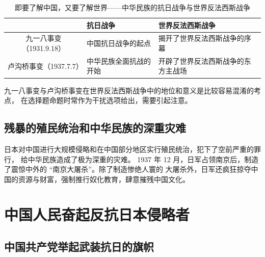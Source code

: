 \documentclass[10pt, UTF8]{book} %
\begin{document}
\begin{table}[H]
    \centering
    \caption{即要了解中国，又要了解世界——中华民族的抗日战争与世界反法西斯战争}
    \begin{tabular}{c|p{}p{}}
        \hline
        & \textbf{抗日战争} & \textbf{世界反法西斯战争} \\
        \hline 
        九一八事变（1931.9.18） & 中国抗日战争的起点 & 揭开了世界反法西斯战争的序幕 \\ 
        \hline 
        卢沟桥事变（1937.7.7） & 中华民族全面抗战的开始 & 开辟了世界反法西斯战争的东方主战场 \\ 
        \hline 
    \end{tabular}
\end{table}
\begin{remark}
    九一八事变与卢沟桥事变在世界反法西斯战争中的地位和意义是比较容易混淆的考点，
    在选择题命题时常作为干扰选项给出，需要引起注意。
\end{remark}

\subsection{残暴的殖民统治和中华民族的深重灾难}

日本对中国进行大规模侵略和在中国部分地区实行殖民统治，犯下了空前严重的罪行，
给中华民族造成了极为深重的灾难。
1937 年 12 月，日军占领南京后，制造了震惊中外的 “南京大屠杀”。除了制造惨绝人寰的
大屠杀外，日军还疯狂掠夺中国的资源与财富，强制推行奴化教育，肆意摧残中国文化。

\section{中国人民奋起反抗日本侵略者}

\subsection{中国共产党举起武装抗日的旗帜}


\end{document}
